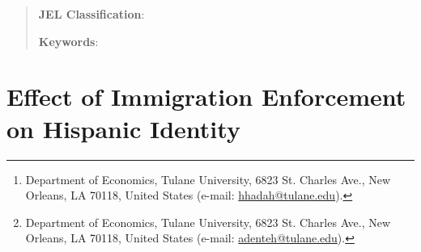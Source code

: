 \documentclass[12pt,english]{article}
\begin{document}
\title{}

\author{\href{https://hussainhadah.com/}{Hussain Hadah}\thanks{Department of Economics, Tulane University, 6823 St. Charles Ave., New Orleans, LA 70118, United States (e-mail: \href{mailto:hhadah@tulane.edu}{hhadah@tulane.edu}).} \quad \href{https://austindenteh.com/}{Augustine Denteh}\thanks{Department of Economics, Tulane University, 6823 St. Charles Ave., New Orleans, LA 70118, United States (e-mail: \href{mailto:adenteh@tulane.edu}{adenteh@tulane.edu}).}}


\maketitle
\begin{abstract}
\singlespacing 

\noindent\textbf{JEL Classification}: 

\noindent\textbf{Keywords}: 

\end{abstract}

\vfill
\pagebreak{}

\section{Effect of Immigration Enforcement on Hispanic Identity}
\end{document}
